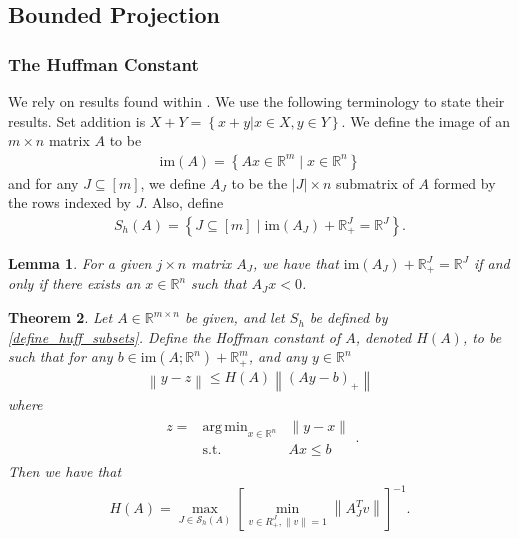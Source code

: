 \documentclass{article}
\newtheorem{theorem}{Theorem}[section]
\newtheorem{lemma}[theorem]{Lemma}
\theoremstyle{case}
\numberwithin{theorem}{subsection}
\DeclareMathOperator*{\argmin}{arg\,min}
\newcommand{\reals}{\mathbb R}
\newcommand{\Rm}{\mathbb R^m}
\newcommand{\Rn}{\mathbb R^n}
\newcommand{\image}{{\textrm{im}}}
\begin{document}
\subsection{Bounded Projection}

\subsubsection{The Huffman Constant}

We rely on results found within \cite{pena2020new}.
We use the following terminology to state their results.
Set addition is $X + Y = \left\{x + y | x \in X, y \in Y\right\}$.
We define the image of an $m\times n$ matrix $A$ to be
\begin{align}
\image(A) = \left\{Ax \in \Rm \;|\; x \in \Rn \right\} \label{define_image}
\end{align}
and for any $J \subseteq [m]$, we define $A_J$ to be the $|J| \times n$ submatrix of $A$ 
formed by the rows indexed by $J$.
Also, define 
\begin{align}
S_h(A) = \left\{J \subseteq [m] \; | \; \image(A_J) + \reals_+^J = \reals^J \right\}. \label{define_huff_subsets}
\end{align}

\begin{lemma}
For a given $j \times n$ matrix $A_J$, we have that 
$\image(A_J) + \reals_+^J = \reals^J$
if and only if there exists an $x \in \Rn$ such that
$A_J x < 0$.
\end{lemma}


\begin{theorem}
\label{hoffman_theorem}
Let $A \in \mathbb R^{m \times n}$ be given, and let $S_h$ be defined by \cref{define_huff_subsets}.
Define the Hoffman constant of $A$, denoted $H(A)$, to be such that for any 
$b \in \image(A; \Rn) + \reals^m_+$, and any $y \in \Rn$
\begin{align*}
\left\|y - z\right\| \le H(A) \left\|\left(Ay - b\right)_+\right\|
\end{align*}
where
\begin{align*}
\begin{array}{ccc}
z = & \argmin_{x \in \Rn} & \|y - x\| \\
      & \textrm{s.t.}    & Ax \le b
\end{array}.
\end{align*}
Then we have that
\begin{align*}
H(A) = \max_{J \in \mathcal S_h(A)} \left[\min_{v \in R^J_+, \|v\| = 1}  \left\|A_J^Tv\right\| \right]^{-1}.
\end{align*}
\end{theorem}
\end{document}
